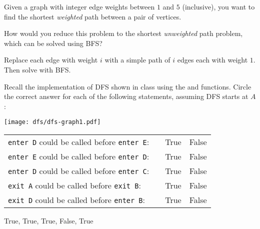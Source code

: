 %

\begin{problem}

Given a graph with integer edge weights between $1$ and $5$
(inclusive), you want to find the shortest \emph{weighted} path
between a pair of vertices. 

\ask
How would you reduce this problem to the
shortest \emph{unweighted} path problem, which can be solved using
BFS?

\sol
Replace each edge with weight $i$ with a simple path of $i$ edges
each with weight $1$. Then solve with BFS.
\end{problem}

%
\begin{problem}

Recall the implementation of DFS shown in class using the 
and  functions. Circle the correct answer for each of the
following statements, assuming DFS starts at $A$:

\begin{center}
  \texttt{[image: dfs/dfs-graph1.pdf]}
\end{center}

\bigskip
  \begin{tabular}{lp{1.3in}cc}
    \texttt{enter D} could be called before \texttt{enter E}:& &
    \textsf{True} & \textsf{False}\\[1.5 ex]
    \texttt{enter E} could be called before \texttt{enter D}:& & \textsf{True} & \textsf{False}\\[1.5 ex]
    \texttt{enter D} could be called before \texttt{enter C}:& & \textsf{True} & \textsf{False}\\[1.5 ex]
    \texttt{exit A} could be called before \texttt{exit B}: & & \textsf{True} & \textsf{False}\\[1.5 ex]
    \texttt{exit D} could be called before \texttt{enter B}:&  & \textsf{True} & \textsf{False}
  \end{tabular}

\sol
    True, True, True, False, True
\end{problem}

%

